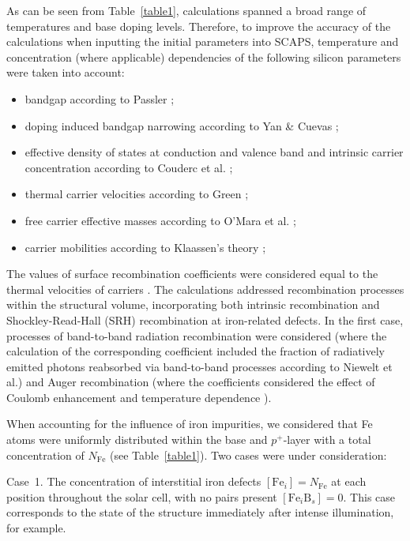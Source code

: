 \documentclass[a4paper,fleqn]{cas-sc}
\begin{document}
As can be seen from Table~\ref{table1}, calculations spanned a broad range of temperatures and base doping levels.
Therefore, to improve the accuracy of the calculations when inputting the initial parameters into SCAPS,
temperature and concentration (where applicable) dependencies of the following silicon parameters were taken into account:

\begin{itemize}[itemsep=2pt, parsep=0pt, topsep=0pt]
    \item bandgap according to Passler \cite{Passler2002};
    \item doping induced bandgap narrowing according to Yan \& Cuevas \cite{EgNarrow};
    \item effective density of states at conduction and valence band and intrinsic carrier concentration according to Couderc et al. \cite{Si_ni_Couderc};
    \item thermal carrier velocities according to Green \cite{Nc:Green};
    \item free carrier effective masses according to O’Mara et al. \cite{OMara};
    \item carrier mobilities according to Klaassen's theory \cite{KLAASSEN953};
\end{itemize}

The values of surface recombination coefficients were considered equal to the thermal velocities of carriers \cite{Fell2015}.
The calculations addressed recombination processes within the structural volume,
incorporating both intrinsic recombination and Shockley-Read-Hall (SRH) recombination at iron-related defects.
In the first case, processes of band-to-band radiation recombination were considered
(where the calculation of the corresponding coefficient included the fraction of radiatively emitted photons
reabsorbed via band-to-band processes according to Niewelt et al.\cite{Brad2022})
and Auger recombination (where the coefficients considered the effect of Coulomb enhancement \cite{AugerSi2022} and temperature dependence \cite{Si_Auger}).


When accounting for the influence of iron impurities,
we considered that Fe atoms were uniformly distributed within the base and $p^+$-layer
with a total concentration of $N_\mathrm{Fe}$ (see Table~\ref{table1}).
Two cases were under consideration:

Case~1.
The concentration of interstitial iron defects $\left[\mathrm{Fe}_i\right]=N_\mathrm{Fe}$  at each position throughout the solar cell,
with no pairs present $\left[\mathrm{Fe}_i\mathrm{B}_s\right]=0$.
This case corresponds to the state of the structure immediately after intense illumination, for example.
\end{document}
